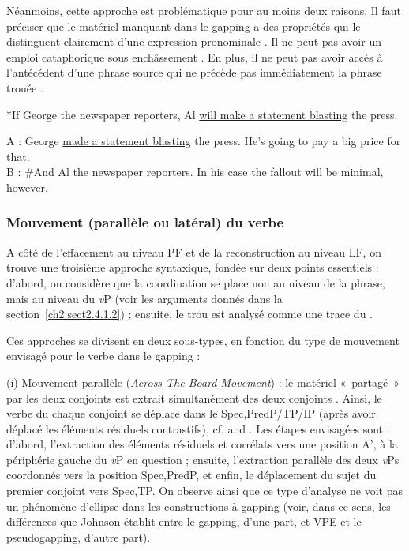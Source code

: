 Néanmoins, cette approche est problématique pour au moins deux raisons. Il faut préciser que le matériel manquant dans le gapping a des propriétés qui le distinguent clairement d’une expression pronominale \citep{Kehler2002}. Il ne peut pas avoir un emploi cataphorique sous enchâssement . En plus, il ne peut pas avoir accès à l’antécédent d’une phrase source qui ne précède pas immédiatement la phrase trouée .

\ea \label{ch2:ex211}
*If George the newspaper reporters, Al \uline{will make a statement blasting} the press. \citep[91]{Kehler2002} 
\z

\ea \label{ch2:ex212}
A : George \uline{made a statement blasting} the press. He’s going to pay a big price for that.\\
B : \#And Al the newspaper reporters. In his case the fallout will be minimal, however. \citep[91]{Kehler2002} 
\z


\subsubsection{Mouvement (parallèle ou latéral) du verbe} \label{ch2:sect2.4.2.3}

A côté de l’effacement au niveau PF et de la reconstruction au niveau LF, on trouve une troisième approche syntaxique, fondée sur deux points essentiels : d’abord, on considère que la coordination se place non au niveau de la phrase, mais au niveau du \textit{v}P (voir les arguments donnés dans la section~\ref{ch2:sect2.4.1.2}) ; ensuite, le trou est analysé comme une trace du .

Ces approches se divisent en deux sous-types, en fonction du type de mouvement envisagé pour le verbe dans le gapping :

(i) Mouvement parallèle (\textit{Across-The-Board Movement}) : le matériel «~partagé~» par les deux conjoints est extrait simultanément des deux conjoints . Ainsi, le verbe du chaque conjoint se déplace dans le Spec,PredP/TP/IP (après avoir déplacé les éléments résiduels contrastifs), cf. \citet{Johnson1996/2004,Johnson2000,Johnson2009} and \citet{ZoernerEtAl2000}. Les étapes envisagées sont : d’abord, l’extraction des éléments résiduels et corrélats vers une position A’, à la périphérie gauche du \textit{v}P en question ; ensuite, l’extraction parallèle des deux \textit{v}Ps coordonnés vers la position Spec,PredP, et enfin, le déplacement du sujet du premier conjoint vers Spec,TP. On observe ainsi que ce type d’analyse ne voit pas un phénomène d’ellipse dans les constructions à gapping (voir, dans ce sens, les différences que Johnson établit entre le gapping, d’une part, et VPE et le pseudogapping, d’autre part).

